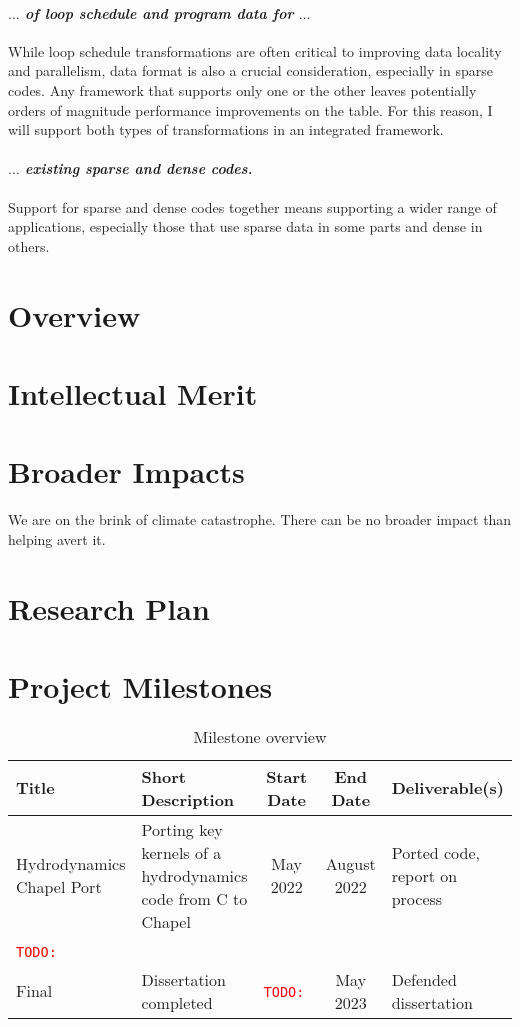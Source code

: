 \documentclass{article}
\newcommand{\todo}[1]{{\textcolor{red}{{\tt{TODO:}}\,\,#1 }}}
\begin{document}
\paragraph{$\dots$ \textit{of loop schedule and program data for} $\dots$}
While loop schedule transformations are often critical to improving data locality and parallelism, data format is also a crucial consideration, especially in sparse codes. 
Any framework that supports only one or the other leaves potentially orders of magnitude performance improvements on the table.
For this reason, I will support both types of transformations in an integrated framework.
\paragraph{$\dots$ \textit{existing sparse and dense codes.}}
Support for sparse and dense codes together means supporting a wider range of applications, especially those that use sparse data in some parts and dense in others.
\section{Overview}

\section{Intellectual Merit}


\section{Broader Impacts}

We are on the brink of climate catastrophe. 
There can be no broader impact than helping avert it.

\section{Research Plan}


\section{Project Milestones}

\begin{table*}[h]
    \centering
\begin{tabular}{|p{2.5cm}|p{5cm}|c|c|p{3cm}|}
    \hline
    \textbf{Title} & Short Description & Start Date & End Date & Deliverable(s)\\
    \hline
    Hydrodynamics \linebreak Chapel Port & Porting key kernels of a hydrodynamics code from C to Chapel & May 2022 & August 2022 & Ported code, report on process \\
    \hline
    \todo{} & & & & \\
    \hline
    Final & Dissertation completed & \todo{} & May 2023 & Defended dissertation\\
    \hline
\end{tabular}

\caption{Milestone overview}
\label{MilestoneTable}
\end{table*}
\end{document}

